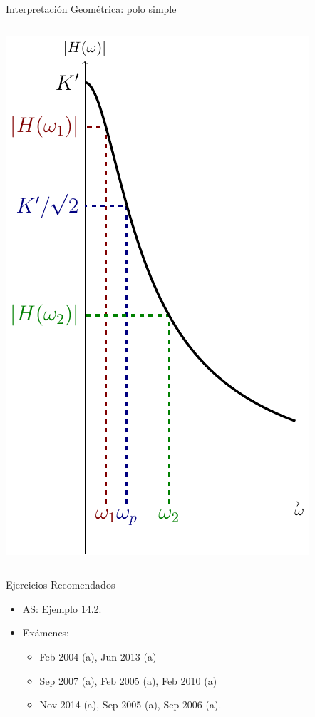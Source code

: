 \documentclass[xcolor={usenames,svgnames,dvipsnames}]{beamer}
\begin{document}
\begin{frame}[label={sec:org39257ce}]{Interpretación Geométrica: polo simple}
\begin{columns}
\begin{column}{0.5\columnwidth}
\begin{center}
\includegraphics[height=0.6\textheight]{../figs/PoloGeometricaPlot.pdf}
\end{center}
\end{column}
\end{columns}
\end{frame}

\begin{frame}[label={sec:org9f01a96}]{Ejercicios Recomendados}
\begin{itemize}
\item AS: Ejemplo 14.2.
\item Exámenes:
\begin{itemize}
\item Feb 2004 (a), Jun 2013 (a)
\item Sep 2007 (a), Feb 2005 (a), Feb 2010 (a)
\item Nov 2014 (a), Sep 2005 (a), Sep 2006 (a).
\end{itemize}
\end{itemize}
\end{frame}
\end{document}
